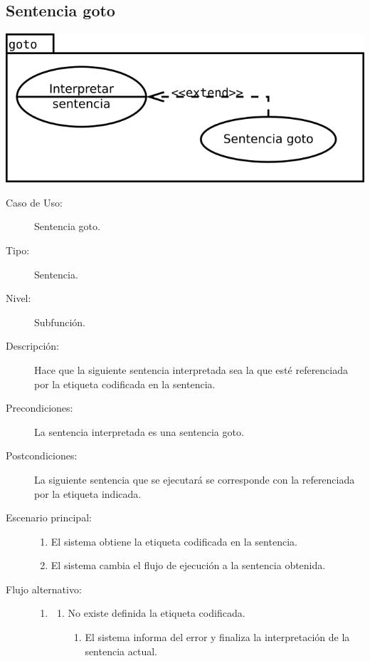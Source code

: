 \subsection {Sentencia goto}
\begin{center}
\includegraphics[scale=0.4]{goto.png} \\
\end{center}
\begin{framed}
\FloatBarrier
\begin{description}
   \item[Caso de Uso:]  Sentencia goto.
   \item [Tipo:] Sentencia.
   \item[Nivel:]  Subfunción.
   \item[Descripción:] 
   Hace que la siguiente sentencia interpretada sea la que esté referenciada 
   por la etiqueta codificada en la sentencia. 
   \item[Precondiciones:] 
   La sentencia interpretada es una sentencia goto.
   \item[Postcondiciones:] La siguiente sentencia que se ejecutará se 
   corresponde con la referenciada por la etiqueta indicada.
   \item[Escenario principal:] \hfill
   \begin{enumerate}
   \item El sistema obtiene la etiqueta codificada en la sentencia.
   \item El sistema cambia el flujo de ejecución a la sentencia obtenida.
   \end{enumerate}
   \item[Flujo alternativo:] \hfill 
   \begin{enumerate} \itemsep1pt \parskip0pt 
   \setcounter{enumi}{0}
   \renewcommand{\labelenumi}{}
   \renewcommand{\labelenumiii}{\arabic{enumiii}.}
   \renewcommand{\labelenumii}{\arabic{enumi}\alph{enumii}.}
      \item 
      \begin {enumerate}
         \setcounter{enumii}{0}
         \item No existe definida la etiqueta codificada.
         \begin{enumerate}
         \item El sistema informa del error y finaliza la  interpretación 
         de la sentencia actual.
         \end{enumerate}
      \end{enumerate}
   \end{enumerate}
\end{description}
 \FloatBarrier
\end{framed}

